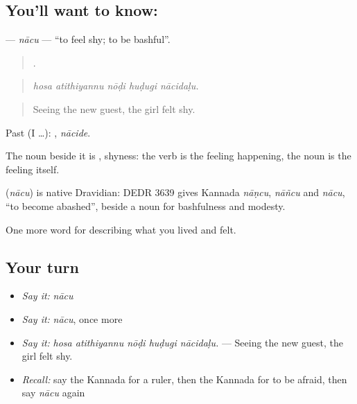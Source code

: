 \subsection*{You'll want to know: }
\textbf{} — \emph{nācu} — \textquotedblleft{}to feel shy; to be bashful\textquotedblright{}.

\begin{quote}
    .
\end{quote}

\begin{quote}
\emph{hosa atithiyannu nōḍi huḍugi nācidaḷu.}
\end{quote}

\begin{quote}
Seeing the new guest, the girl felt shy.
\end{quote}

Past (I …): , \emph{nācide}.

The noun beside it is , shyness: the verb is the feeling happening, the noun is the feeling itself.

\begin{cousinweb}
\textbf{} (\emph{nācu}) is native Dravidian: DEDR 3639 gives Kannada \emph{nāṇcu}, \emph{nāñcu} and \emph{nācu}, \textquotedblleft{}to become abashed\textquotedblright{}, beside a noun for bashfulness and modesty.
\end{cousinweb}

\begin{grammarlens}[title={What you've built}]
One more word for describing what you lived and felt.
\end{grammarlens}

\subsection*{Your turn}
\begin{itemize}
\raggedright
  \item \emph{Say it:} \emph{nācu}
  \item \emph{Say it:} \emph{nācu}, once more
  \item \emph{Say it:} \emph{hosa atithiyannu nōḍi huḍugi nācidaḷu.} — Seeing the new guest, the girl felt shy.
  \item \emph{Recall:} say the Kannada for a ruler, then the Kannada for to be afraid, then say \emph{nācu} again
\end{itemize}

